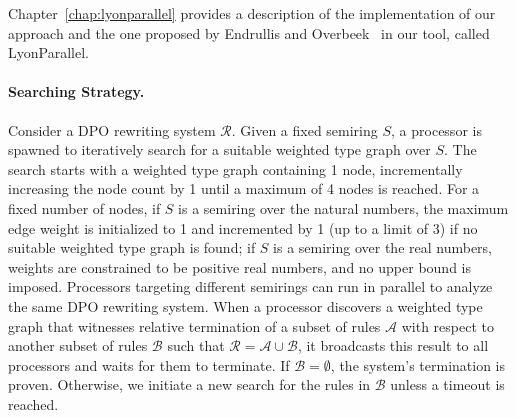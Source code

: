 Chapter~\ref{chap:lyonparallel} provides a description of the implementation of our approach and the one proposed by Endrullis and Overbeek~\cite{endrullis2024generalized_arxiv_v2} in our tool, called LyonParallel.

\paragraph{Searching Strategy.}
Consider a DPO rewriting system $\mathcal{R}$. Given a fixed semiring $S$, a processor is spawned to iteratively search for a suitable weighted type graph over $S$.
The search starts with a weighted type graph containing 1 node, incrementally increasing the node count by 1 until a maximum of 4 nodes is reached.
For a fixed number of nodes,
 if $S$ is a semiring over the natural numbers, the maximum edge weight is initialized to 1 and incremented by 1 (up to a limit of 3) if no suitable weighted type graph is found;
if $S$ is a semiring over the real numbers, weights are constrained to be positive real numbers, and no upper bound is imposed.
Processors targeting different semirings can run in parallel to analyze the same DPO rewriting system.
When a processor discovers a weighted type graph that witnesses relative termination of a subset of rules $\mathcal{A}$ with respect to another subset of rules $\mathcal{B}$ such that $\mathcal{R} \mathop{=} \mathcal{A} \mathop{\cup} \mathcal{B}$, it broadcasts this result to all processors and waits for them to terminate. If $\mathcal{B} \mathop{=} \emptyset$, the system's termination is proven. Otherwise, we initiate a new search for the rules in $\mathcal{B}$ unless a timeout is reached.
 

